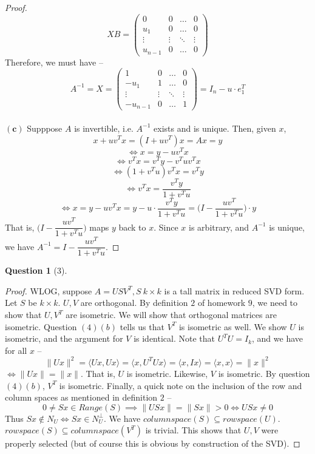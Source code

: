\documentclass[11pt]{article}
\theoremstyle{quest}
\newtheorem*{question}{Question}
\begin{document}
\begin{proof}
$$XB = \begin{pmatrix}
0 & 0 & \ldots & 0 \\
u_1 & 0 & \ldots & 0 \\
\vdots & \vdots & \ddots & \vdots \\
u_{n-1} & 0 & \ldots & 0
\end{pmatrix} $$
Therefore, we must have --
$$A^{-1} = X = \begin{pmatrix}
1 & 0 & \ldots & 0 \\
-u_1 & 1 & \ldots & 0 \\
\vdots & \vdots & \ddots & \vdots \\
-u_{n-1} & 0 & \ldots & 1
\end{pmatrix} = I_n -u \cdot e_1^T$$
\\$\mathbf{(c)}$ Supppose $A$ is invertible, i.e. $A^{-1}$ exists and is unique. Then, given $x$,
$$x + uv^Tx = (I + uv^T)x = Ax = y$$
$$\iff x = y - uv^Tx$$
$$\iff v^Tx = v^Ty - v^Tuv^Tx$$
$$\iff (1 + v^Tu)v^Tx = v^Ty$$
$$\iff v^Tx = \dfrac{v^Ty}{1 + v^Tu}$$
$$\iff x = y - uv^Tx = y - u \cdot \dfrac{v^Ty}{1 + v^Tu} = \Big(I - \dfrac{uv^T}{1 + v^Tu}\Big) \cdot y$$
That is, $\Big(I - \dfrac{uv^T}{1 + v^Tu}\Big)$ maps $y$ back to $x$. Since $x$ is arbitrary, and $A^{-1}$ is unique, we have $A^{-1} = I - \dfrac{uv^T}{1 + v^Tu}$.
\end{proof}

\begin{question}[3]
\end{question}
\begin{proof}
WLOG, suppose $A = USV^T, S\ k \times k$ is a tall matrix in reduced SVD form. Let $S$ be $k \times k$. $U, V$ are orthogonal. By definition $2$ of homework $9$, we need to show that $U, V^T$ are isometric. We will show that orthogonal matrices are isometric. Question $(4)(b)$ tells us that $V^T$ is isometric as well.
We show $U$ is isometric, and the argument for $V$ is identical. Note that $U^TU = I_k$, and we have for all $x$ --
$$\|Ux\|^2 = \langle Ux, Ux \rangle = \langle x, U^TUx \rangle = \langle x, Ix \rangle =\langle x, x \rangle = \|x\|^2$$
$\iff \|Ux\| = \|x\|$. That is, $U$ is isometric. Likewise, $V$ is isometric. By question $(4)(b)$, $V^T$ is isometric. Finally, a quick note on the inclusion of the row and column spaces as mentioned in definition $2$ --
$$0 \ne Sx \in Range(S) \implies \|USx\| = \|Sx\| > 0 \iff USx \ne 0$$
Thus $Sx \not\in N_U \iff Sx \in N_U^{\perp}$. We have $columnspace(S) \subseteq rowspace(U)$.
\\$rowspace(S) \subseteq columnspace(V^T)$ is trivial. This shows that $U, V$ were properly selected (but of course this is obvious by construction of the SVD).
\end{proof}
\end{document}
